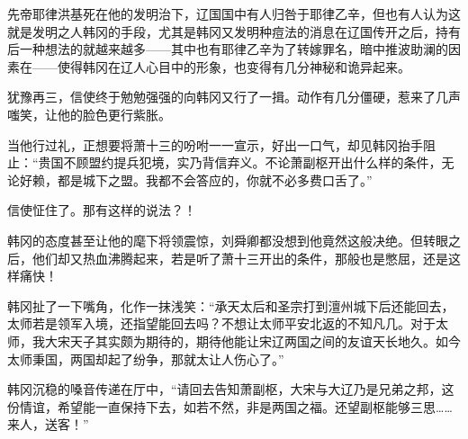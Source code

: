 先帝耶律洪基死在他的发明治下，辽国国中有人归咎于耶律乙辛，但也有人认为这就是发明之人韩冈的手段，尤其是韩冈又发明种痘法的消息在辽国传开之后，持有后一种想法的就越来越多——其中也有耶律乙辛为了转嫁罪名，暗中推波助澜的因素在——使得韩冈在辽人心目中的形象，也变得有几分神秘和诡异起来。

犹豫再三，信使终于勉勉强强的向韩冈又行了一揖。动作有几分僵硬，惹来了几声嗤笑，让他的脸色更行紫胀。

当他行过礼，正想要将萧十三的吩咐一一宣示，好出一口气，却见韩冈抬手阻止：“贵国不顾盟约提兵犯境，实乃背信弃义。不论萧副枢开出什么样的条件，无论好赖，都是城下之盟。我都不会答应的，你就不必多费口舌了。”

信使怔住了。那有这样的说法？！

韩冈的态度甚至让他的麾下将领震惊，刘舜卿都没想到他竟然这般决绝。但转眼之后，他们却又热血沸腾起来，若是听了萧十三开出的条件，那般也是憋屈，还是这样痛快！

韩冈扯了一下嘴角，化作一抹浅笑：“承天太后和圣宗打到澶州城下后还能回去，太师若是领军入境，还指望能回去吗？不想让太师平安北返的不知凡几。对于太师，我大宋天子其实颇为期待的，期待他能让宋辽两国之间的友谊天长地久。如今太师秉国，两国却起了纷争，那就太让人伤心了。”

韩冈沉稳的嗓音传递在厅中，“请回去告知萧副枢，大宋与大辽乃是兄弟之邦，这份情谊，希望能一直保持下去，如若不然，非是两国之福。还望副枢能够三思……来人，送客！”

